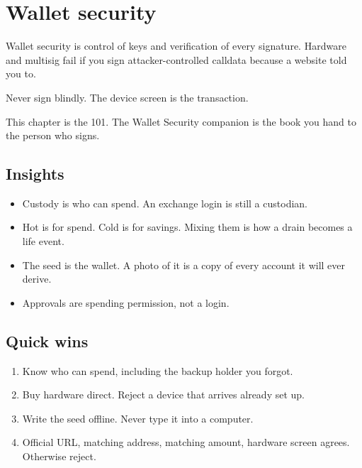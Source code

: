 \chapter{Wallet security}

Wallet security is control of keys and verification of
every signature. Hardware and multisig fail if you sign
attacker-controlled calldata because a website told you
to.

Never sign blindly. The device screen is the
transaction.

This chapter is the 101. The Wallet Security companion
is the book you hand to the person who signs.

\section{Insights}

\begin{itemize}
  \item Custody is who can spend. An exchange login is
  still a custodian.
  \item Hot is for spend. Cold is for savings. Mixing
  them is how a drain becomes a life event.
  \item The seed is the wallet. A photo of it is a
  copy of every account it will ever derive.
  \item Approvals are spending permission, not a login.
\end{itemize}

\section{Quick wins}

\begin{enumerate}
  \item Know who can spend, including the backup holder
  you forgot.
  \item Buy hardware direct. Reject a device that
  arrives already set up.
  \item Write the seed offline. Never type it into a
  computer.
  \item Official URL, matching address, matching amount,
  hardware screen agrees. Otherwise reject.
\end{enumerate}

